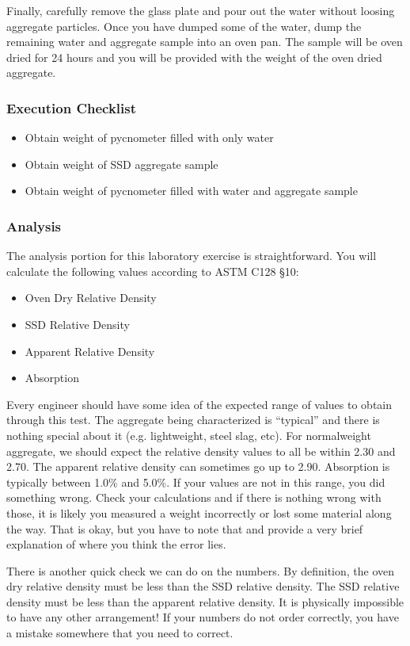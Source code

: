 \documentclass[12pt]{article}
\begin{document}
Finally, carefully remove the glass plate and pour out the water without loosing aggregate particles. Once you have dumped some of the water, dump the remaining water and aggregate sample into an oven pan. The sample will be oven dried for 24 hours and you will be provided with the weight of the oven dried aggregate.

\subsubsection*{Execution Checklist}
\begin{itemize}
    \item Obtain weight of pycnometer filled with only water
    \item Obtain weight of SSD aggregate sample
    \item Obtain weight of pycnometer filled with water and aggregate sample
\end{itemize}

\subsubsection{Analysis}
The analysis portion for this laboratory exercise is straightforward. You will calculate the following values according to ASTM C128 \S 10:
\begin{itemize}
    \item Oven Dry Relative Density
    \item SSD Relative Density
    \item Apparent Relative Density
    \item Absorption
\end{itemize}

Every engineer should have some idea of the expected range of values to obtain through this test. The aggregate being characterized is ``typical'' and there is nothing special about it (e.g. lightweight, steel slag, etc). For normalweight aggregate, we should expect the relative density values to all be within 2.30 and 2.70. The apparent relative density can sometimes go up to 2.90. Absorption is typically between 1.0\% and 5.0\%. If your values are not in this range, you did something wrong. Check your calculations and if there is nothing wrong with those, it is likely you measured a weight incorrectly or lost some material along the way. That is okay, but you have to note that and provide a very brief explanation of where you think the error lies.

There is another quick check we can do on the numbers. By definition, the oven dry relative density must be less than the SSD relative density. The SSD relative density must be less than the apparent relative density. It is physically impossible to have any other arrangement! If your numbers do not order correctly, you have a mistake somewhere that you need to correct.
\end{document}
